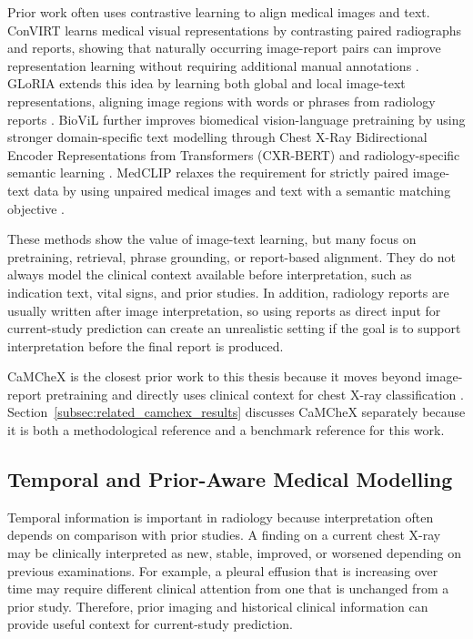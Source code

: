 Prior work often uses contrastive learning to align medical images and text. ConVIRT learns medical visual representations by contrasting paired radiographs and reports, showing that naturally occurring image-report pairs can improve representation learning without requiring additional manual annotations \cite{zhang2022convirt}. GLoRIA extends this idea by learning both global and local image-text representations, aligning image regions with words or phrases from radiology reports \cite{huang2021gloria}. BioViL further improves biomedical vision-language pretraining by using stronger domain-specific text modelling through Chest X-Ray Bidirectional Encoder Representations from Transformers (CXR-BERT) and radiology-specific semantic learning \cite{boecking2022biovil}. MedCLIP relaxes the requirement for strictly paired image-text data by using unpaired medical images and text with a semantic matching objective \cite{wang2022medclip}.

These methods show the value of image-text learning, but many focus on pretraining, retrieval, phrase grounding, or report-based alignment. They do not always model the clinical context available before interpretation, such as indication text, vital signs, and prior studies. In addition, radiology reports are usually written after image interpretation, so using reports as direct input for current-study prediction can create an unrealistic setting if the goal is to support interpretation before the final report is produced.

CaMCheX is the closest prior work to this thesis because it moves beyond image-report pretraining and directly uses clinical context for chest X-ray classification \cite{sloan2025camchex}. Section~\ref{subsec:related_camchex_results} discusses CaMCheX separately because it is both a methodological reference and a benchmark reference for this work.

\subsection{Temporal and Prior-Aware Medical Modelling}
\label{subsec:related_temporal}

Temporal information is important in radiology because interpretation often depends on comparison with prior studies. A finding on a current chest X-ray may be clinically interpreted as new, stable, improved, or worsened depending on previous examinations. For example, a pleural effusion that is increasing over time may require different clinical attention from one that is unchanged from a prior study. Therefore, prior imaging and historical clinical information can provide useful context for current-study prediction.

